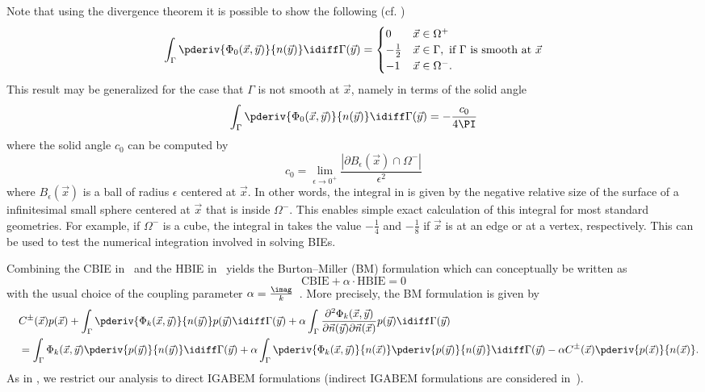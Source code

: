 Note that using the divergence theorem it is possible to show the following (cf. \cite[p. 126]{Sauter2011bem})
\begin{equation*}
	\int_\Gamma \pderiv{\Phi_0(\vec{x},\vec{y})}{n(\vec{y})}\idiff\Gamma(\vec{y})=\begin{cases}
		0 & \vec{x}\in\Omega^+\\
		-\frac{1}{2} & \vec{x}\in\Gamma,\text{ if } \Gamma \text{ is smooth at } \vec{x}\\
		-1 & \vec{x}\in\Omega^-.
	\end{cases}
\end{equation*}
This result may be generalized for the case that $\Gamma$ is not smooth at $\vec{x}$, namely in terms of the solid angle~\cite{Sun2015bri}
\begin{equation}\label{Eq3:Phi0SolidAngle}
	\int_\Gamma \pderiv{\Phi_0(\vec{x},\vec{y})}{n(\vec{y})}\idiff\Gamma(\vec{y}) = -\frac{c_0}{4\PI}
\end{equation}
where the solid angle $c_0$ can be computed by
\begin{equation*}
	c_0 = \lim_{\epsilon\to 0^+}\frac{|\partial B_\epsilon(\vec{x})\cap\Omega^-|}{\epsilon^2}
\end{equation*}
where $B_\epsilon(\vec{x})$ is a ball of radius $\epsilon$ centered at $\vec{x}$. In other words, the integral in  is given by the negative relative size of the surface of a infinitesimal small sphere centered at $\vec{x}$ that is inside $\Omega^-$. This enables simple exact calculation of this integral for most standard geometries. For example, if $\Omega^-$ is a cube, the integral in  takes the value $-\frac14$ and $-\frac{1}{8}$ if $\vec{x}$ is at an edge or at a vertex, respectively. This can be used to test the numerical integration involved in solving BIEs.

Combining the CBIE in~ and the HBIE in~ yields the Burton--Miller (BM) formulation which can conceptually be written as
\begin{equation*}
	\mathrm{CBIE} + \alpha\cdot\mathrm{HBIE} = 0
\end{equation*}
with the usual choice of the coupling parameter $\alpha=\frac{\imag}{k}$~\cite{Zheng2015itb}. More precisely, the BM formulation is given by
\begin{equation}\label{Eq3:BM}
\begin{aligned}
	&C^\pm(\vec{x})p(\vec{x}) + \int_\Gamma \pderiv{\Phi_k(\vec{x},\vec{y})}{n(\vec{y})} p(\vec{y}) \idiff\Gamma(\vec{y}) + \alpha\int_\Gamma \frac{\partial^2\Phi_k(\vec{x},\vec{y})}{\partial\vec{n}(\vec{y})\partial\vec{n}(\vec{x})} p(\vec{y}) \idiff\Gamma(\vec{y})\\
	\quad&=\int_\Gamma \Phi_k(\vec{x},\vec{y}) \pderiv{p(\vec{y})}{n(\vec{y})} \idiff\Gamma(\vec{y})+\alpha\int_\Gamma \pderiv{\Phi_k(\vec{x},\vec{y})}{n(\vec{x})} \pderiv{p(\vec{y})}{n(\vec{y})} \idiff\Gamma(\vec{y}) - \alpha C^\pm(\vec{x})\pderiv{p(\vec{x})}{n(\vec{x})}.
\end{aligned}
\end{equation}
As in \cite{Simpson2014aib}, we restrict our analysis to direct IGABEM formulations (indirect IGABEM formulations are considered in~\cite{Coox2017aii,Dolz2018afi,Wu2020iib}).


